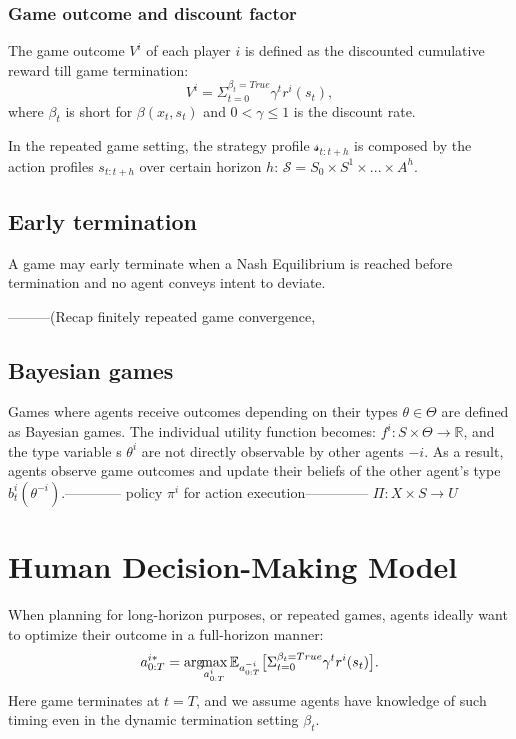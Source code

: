 \documentclass[letterpaper, 10 pt, conference]{ieeeconf}  %
\newcommand{\argmax}{\arg\!\!\max}
\begin{document}
\subsubsection{Game outcome and discount factor}
The game outcome $V^i$ of each player $i$ is defined as the discounted cumulative reward till game termination:
\begin{equation}
  V^i = \Sigma_{t=0}^{\beta_t=True} \gamma^t r^i(s_t),  
\end{equation}
where $\beta_t$ is short for $\beta(x_t,s_t)$ and $0<\gamma \leq 1$ is the discount rate.

In the repeated game setting, the strategy profile $\mathcal{s}_{t:t+h}$ is composed by the action profiles $s_{t:t+h}$ over certain horizon $h$: $\mathcal{S} = S_0 \times S^1 \times... \times A^h$.

\subsection{Early termination}
A game may early terminate when a Nash Equilibrium is reached before termination and no agent conveys intent to deviate.

---------(Recap finitely repeated game convergence, 

\subsection{Bayesian games}
Games where agents receive outcomes depending on their types $\theta \in \Theta$ are defined as Bayesian games. The individual utility function becomes: $f^i:S\times \Theta \rightarrow \mathbb{R}$, and the type variable s $\theta^i$ are not directly observable by other agents $-i$. As a result, agents observe game outcomes and update their beliefs of the other agent's type $b^i_t(\theta^{-i})$.------------
policy $\pi^i$ for action execution-------------- $\Pi:X\times S \rightarrow U $
\section{Human Decision-Making Model}
When planning for long-horizon purposes, or repeated games, agents ideally want to optimize their outcome in a full-horizon manner:
\begin{equation}
    a^{i*}_{0:T} = \argmax_{a^i_{0:T}} \mathbb{E}_{a^{-i}_{0:T}} \big{[}\Sigma_{t=0}^{\beta_t=True} \gamma^t r^i(s_t)\big{]}. 
\end{equation}
Here game terminates at $t=T$, and we assume agents have knowledge of such timing even in the dynamic termination setting $\beta_t$. 
\end{document}
